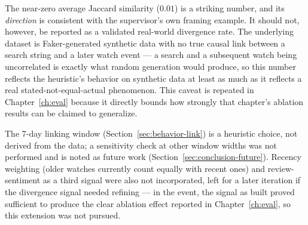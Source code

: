 The near-zero average Jaccard similarity ($0.01$) is a striking number, and its \emph{direction} is
consistent with the supervisor's own framing example. It should not, however, be reported as a
validated real-world divergence rate. The underlying dataset is Faker-generated synthetic data with
no true causal link between a search string and a later watch event --- a search and a subsequent
watch being uncorrelated is exactly what random generation would produce, so this number reflects
the heuristic's behavior on synthetic data at least as much as it reflects a real
stated-not-equal-actual phenomenon. This caveat is repeated in Chapter~\ref{ch:eval} because it
directly bounds how strongly that chapter's ablation results can be claimed to generalize.

The 7-day linking window (Section~\ref{sec:behavior-link}) is a heuristic choice, not derived from
the data; a sensitivity check at other window widths was not performed and is noted as future work
(Section~\ref{sec:conclusion-future}). Recency weighting (older watches currently count equally
with recent ones) and review-sentiment as a third signal were also not incorporated, left for a
later iteration if the divergence signal needed refining --- in the event, the signal as built
proved sufficient to produce the clear ablation effect reported in Chapter~\ref{ch:eval}, so this
extension was not pursued.
